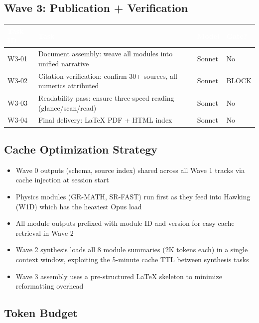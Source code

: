 \documentclass[11pt,letterpaper]{article}
\newcommand{\tableheader}[1]{\textbf{\sffamily\textcolor{white}{#1}}}
\begin{document}
\subsection{Wave 3: Publication + Verification}

\begin{center}
\begin{tabularx}{\textwidth}{L{2.5cm}XC{2cm}C{2cm}}
\toprule
{}
\tableheader{Task ID} & \tableheader{Task} & \tableheader{Model} & \tableheader{Gate?} \\
\midrule
W3-01 & Document assembly: weave all modules into unified narrative & Sonnet & No \\
W3-02 & Citation verification: confirm 30+ sources, all numerics attributed & Sonnet & BLOCK \\
W3-03 & Readability pass: ensure three-speed reading (glance/scan/read) & Sonnet & No \\
W3-04 & Final delivery: LaTeX PDF + HTML index & Sonnet & No \\
\bottomrule
\end{tabularx}
\end{center}

\subsection{Cache Optimization Strategy}

\begin{itemize}[noitemsep]
\item Wave 0 outputs (schema, source index) shared across all Wave 1 tracks via cache injection at session start
\item Physics modules (GR-MATH, SR-FAST) run first as they feed into Hawking (W1D) which has the heaviest Opus load
\item All module outputs prefixed with module ID and version for easy cache retrieval in Wave 2
\item Wave 2 synthesis loads all 8 module summaries (2K tokens each) in a single context window, exploiting the 5-minute cache TTL between synthesis tasks
\item Wave 3 assembly uses a pre-structured LaTeX skeleton to minimize reformatting overhead
\end{itemize}

\subsection{Token Budget}
\end{document}
